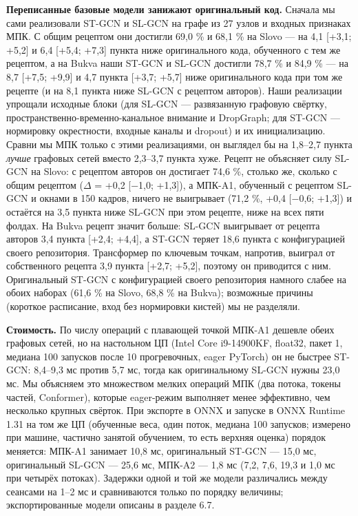 \textbf{Переписанные базовые модели занижают оригинальный код.} Сначала мы сами реализовали ST-GCN и SL-GCN на графе из 27 узлов и входных признаках МПК. С общим рецептом они достигли 69,0 \% и 68,1 \% на Slovo --- на 4,1 {[}+3,1; +5,2{]} и 6,4 {[}+5,4; +7,3{]} пункта ниже оригинального кода, обученного с тем же рецептом, а на Bukva наши ST-GCN и SL-GCN достигли 78,7 \% и 84,9 \% --- на 8,7 {[}+7,5; +9,9{]} и 4,7 пункта {[}+3,7; +5,7{]} ниже оригинального кода при том же рецепте (и на 8,1 пункта ниже SL-GCN с рецептом авторов). Наши реализации упрощали исходные блоки (для SL-GCN --- развязанную графовую свёртку, пространственно-временно-канальное внимание и DropGraph; для ST-GCN --- нормировку окрестности, входные каналы и dropout) и их инициализацию. Сравни мы МПК только с этими реализациями, он выглядел бы на 1,8--2,7 пункта \emph{лучше} графовых сетей вместо 2,3--3,7 пункта хуже. Рецепт не объясняет силу SL-GCN на Slovo: с рецептом авторов он достигает 74,6 \%, столько же, сколько с общим рецептом (\(\Delta\) = +0,2 {[}−1,0; +1,3{]}), а МПК-A1, обученный с рецептом SL-GCN и окнами в 150 кадров, ничего не выигрывает (71,2 \%, +0,4 {[}−0,6; +1,3{]}) и остаётся на 3,5 пункта ниже SL-GCN при этом рецепте, ниже на всех пяти фолдах. На Bukva рецепт значит больше: SL-GCN выигрывает от рецепта авторов 3,4 пункта {[}+2,4; +4,4{]}, а ST-GCN теряет 18,6 пункта с конфигурацией своего репозитория. Трансформер по ключевым точкам, напротив, выиграл от собственного рецепта 3,9 пункта {[}+2,7; +5,2{]}, поэтому он приводится с ним. Оригинальный ST-GCN с конфигурацией своего репозитория намного слабее на обоих наборах (61,6 \% на Slovo, 68,8 \% на Bukva); возможные причины (короткое расписание, вход без нормировки кистей) мы не разделяли.

\textbf{Стоимость.} По числу операций с плавающей точкой МПК-A1 дешевле обеих графовых сетей, но на настольном ЦП (Intel Core i9-14900KF, float32, пакет 1, медиана 100 запусков после 10 прогревочных, eager PyTorch) он не быстрее ST-GCN: 8,4--9,3 мс против 5,7 мс, тогда как оригинальному SL-GCN нужны 23,0 мс. Мы объясняем это множеством мелких операций МПК (два потока, токены частей, Conformer), которые eager-режим выполняет менее эффективно, чем несколько крупных свёрток. При экспорте в ONNX и запуске в ONNX Runtime 1.31 на том же ЦП (обученные веса, один поток, медиана 100 запусков; измерено при машине, частично занятой обучением, то есть верхняя оценка) порядок меняется: МПК-A1 занимает 10,8 мс, оригинальный ST-GCN --- 15,0 мс, оригинальный SL-GCN --- 25,6 мс, МПК-A2 --- 1,8 мс (7,2, 7,6, 19,3 и 1,0 мс при четырёх потоках). Задержки одной и той же модели различались между сеансами на 1--2 мс и сравниваются только по порядку величины; экспортированные модели описаны в разделе 6.7.


